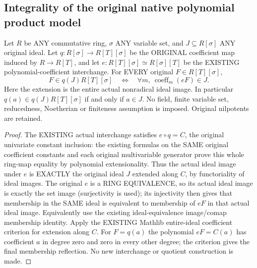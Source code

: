 \subsection{Integrality of the original native polynomial product model}
\begin{lemma}
\label{lem:actual-polynomial-coefficient-ideal-membership}
\leanok
{}
Let $R$ be ANY commutative ring, $\sigma$ ANY variable set, and
$J\subseteq R[\sigma]$ ANY original ideal. Let
$q:R[\sigma]\to R[T][\sigma]$ be the ORIGINAL coefficient map induced
by $R\to R[T]$, and let $e:R[T][\sigma]\simeq R[\sigma][T]$ be the
EXISTING polynomial-coefficient interchange. For EVERY original
$F\in R[T][\sigma]$,
\[F\in q(J)R[T][\sigma]\quad\Longleftrightarrow\quad
  \forall m,\ \operatorname{coeff}_m(eF)\in J.\]
Here the extension is the entire actual nonradical ideal image.
In particular $q(a)\in q(J)R[T][\sigma]$ if and only if $a\in J$.
No field, finite variable set, reducedness, Noetherian or finiteness
assumption is imposed. Original nilpotents are retained.
\end{lemma}
\begin{proof}
The EXISTING actual interchange satisfies $e\circ q=C$, the original
univariate constant inclusion: the existing formulas on the SAME original
coefficient constants and each original multivariable generator prove this
whole ring-map equality by polynomial extensionality. Thus the actual
ideal image under $e$ is EXACTLY the original ideal $J$ extended along $C$,
by functoriality of ideal images. The original $e$ is a RING EQUIVALENCE, so its actual ideal image is
exactly the set image (surjectivity is used); its injectivity then gives
that membership in the SAME ideal is equivalent to membership of $eF$
in that actual ideal image. Equivalently use the existing ideal-equivalence
image/comap membership identity.
Apply the EXISTING Mathlib entire-ideal coefficient criterion for extension
along $C$. For $F=q(a)$ the polynomial $eF=C(a)$ has coefficient $a$ in
degree zero and zero in every other degree; the criterion gives the final
membership reflection. No new interchange or quotient construction is made.
\end{proof}


